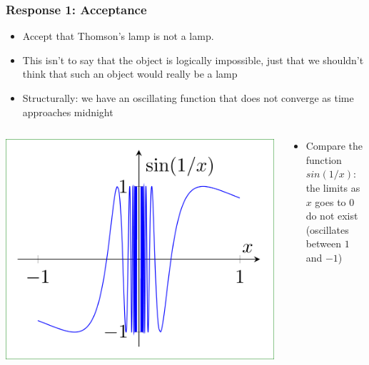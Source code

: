 \begin{frame}
\frametitle{Response 1: Acceptance}

\begin{itemize}[<+->]

\item Accept that Thomson's lamp is not a lamp. 

\item This isn't to say that the object is logically impossible, just that we shouldn't think that such an object would really be a lamp

\item Structurally: we have an oscillating function that does not converge as time approaches midnight


\end{itemize}

 \begin{columns}
    \begin{column}{.4\textwidth}  
 \includegraphics[height=.6\textheight]{../assets/sin_diverge}
    \end{column}
    \begin{column}{.6\textwidth}
\begin{itemize}[<+->]
\item Compare the function $sin(1/x)$: \\ the limits as $x$ goes to $0$ do not exist  \\ (oscillates between $1$ and $-1$)


\end{itemize}
  \end{column}
  \end{columns}

\end{frame}

